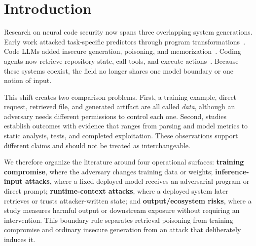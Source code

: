 \documentclass[acmsmall,screen,review]{acmart}
\begin{document}


\maketitle

\section{Introduction} \label{sec:intro}

Research on neural code security now spans three overlapping system generations. Early work attacked task-specific predictors through program transformations~\cite{yefet2020adversarial,zhang2020generating}. Code LLMs added insecure generation, poisoning, and memorization~\cite{schuster2021autocomplete,pearce2022asleep,ziegler2021recitation}. Coding agents now retrieve repository state, call tools, and execute actions~\cite{liu2025yourai,xie2025redteaming}. Because these systems coexist, the field no longer shares one model boundary or one notion of input.

This shift creates two comparison problems. First, a training example, direct request, retrieved file, and generated artifact are all called \emph{data}, although an adversary needs different permissions to control each one. Second, studies establish outcomes with evidence that ranges from parsing and model metrics to static analysis, tests, and completed exploitation. These observations support different claims and should not be treated as interchangeable.

We therefore organize the literature around four operational surfaces: \textbf{training compromise}, where the adversary changes training data or weights; \textbf{inference-input attacks}, where a fixed deployed model receives an adversarial program or direct prompt; \textbf{runtime-context attacks}, where a deployed system later retrieves or trusts attacker-written state; and \textbf{output/ecosystem risks}, where a study measures harmful output or downstream exposure without requiring an intervention. This boundary rule separates retrieval poisoning from training compromise and ordinary insecure generation from an attack that deliberately induces it.
\end{document}
